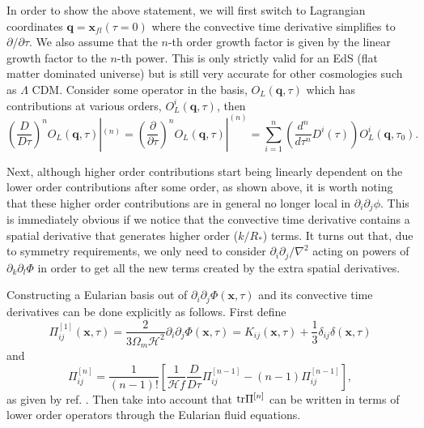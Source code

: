 \documentclass[11pt]{article}
\DeclareRobustCommand{\tr}{\ifmmode\text{tr}\else d\fi}
\newcommand{\br}[1]{\ensuremath{\left( #1 \right)}}
\newcommand{\sbr}[1]{\ensuremath{\left[ #1 \right]}}
\begin{document}
In order to show the above statement, we will first switch to Lagrangian coordinates $\mathbf q = \mathbf x_{fl}(\tau=0)$ where the convective time derivative simplifies to $\partial/\partial \tau$. We also assume that the $n$-th order growth factor is given by the linear growth factor to the $n$-th power. This is only strictly valid for an EdS (flat matter dominated universe) but is still very accurate for other cosmologies such as $\Lambda$ CDM. %
Consider some operator in the basis, $O_L(\mathbf q, \tau)$ which has contributions at various orders, $O_L^i(\mathbf q, \tau)$, then
\begin{equation}
    \br{\frac{D}{D\tau}}^n O_L(\mathbf q, \tau)|^{(n)} = \br{\frac{\partial}{\partial\tau}}^n O_L(\mathbf q, \tau)|^{(n)} = \sum_{i = 1}^n \br{\frac{d^n}{d\tau^n}D^i(\tau)}O^{i}_{L}(\mathbf q, \tau_0).
\end{equation}

Next, although higher order contributions start being linearly dependent on the lower order contributions after some order, as shown above, it is worth noting that these higher order contributions are in general no longer local in $\partial_i\partial_j \phi$. This is immediately obvious if we notice that the convective time derivative contains a spatial derivative that generates higher order ($k/R_*$) terms. It turns out that, due to symmetry requirements, we only need to consider $\partial_i \partial_j / \nabla ^2$ acting on powers of $\partial_k \partial_l \Phi$ in order to get all the new terms created by the extra spatial derivatives. %

Constructing a Eularian basis out of $\partial_i\partial_j\Phi(\mathbf x, \tau)$ and its convective time derivatives can be done explicitly as follows. First define
\begin{equation}
    \Pi^{[1]}_{ij}(\mathbf x, \tau) = \frac{2}{3\Omega_m\mathcal H^2}\partial_i\partial_j\Phi(\mathbf x, \tau) = K_{ij}(\mathbf x, \tau) + \frac{1}{3}\delta_{ij}\delta(\mathbf x, \tau)
\end{equation}
and
\begin{equation}
    \Pi^{[n]}_{ij} = \frac{1}{(n-1)!}\sbr{ \frac{1}{\mathcal H f}\frac{D}{D\tau} \Pi^{[n-1]}_{ij} - (n-1)\Pi^{[n-1]}_{ij}},
\end{equation}
as given by ref. \cite{Mirbabayi_2015}. Then take into account that $\tr \Pi^{[n]}$ can be written in terms of lower order operators through the Eularian fluid equations. %
\end{document}
